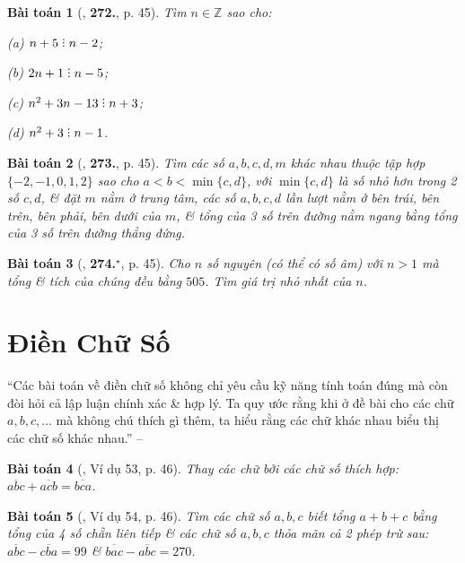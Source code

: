 \documentclass{article}
\numberwithin{equation}{section}
\newtheorem{baitoan}{Bài toán}
\DeclareRobustCommand{\divby}{%
	\mathrel{\vbox{\baselineskip.65ex\lineskiplimit0pt\hbox{.}\hbox{.}\hbox{.}}}%
}
\begin{document}
\begin{baitoan}[\cite{Binh_Toan_6_tap_1}, \textbf{272.}, p. 45]
	Tìm $n\in\mathbb{Z}$ sao cho:
	\begin{enumerate*}
		\item[(a)] $n + 5\divby n - 2$;
		\item[(b)] $2n + 1\divby n - 5$;
		\item[(c)] $n^2 + 3n - 13\divby n + 3$;
		\item[(d)] $n^2 + 3\divby n - 1$.
	\end{enumerate*}
\end{baitoan}

\begin{baitoan}[\cite{Binh_Toan_6_tap_1}, \textbf{273.}, p. 45]
	Tìm các số $a,b,c,d,m$ khác nhau thuộc tập hợp $\{-2,-1,0,1,2\}$ sao cho $a < b < \min\{c,d\}$, với $\min\{c,d\}$ là số nhỏ hơn trong 2 số $c,d$, \& đặt $m$ nằm ở trung tâm, các số $a,b,c,d$ lần lượt nằm ở bên trái, bên trên, bên phải, bên dưới của $m$, \& tổng của 3 số trên đường nằm ngang bằng tổng của 3 số trên đường thẳng đứng.
\end{baitoan}

\begin{baitoan}[\cite{Binh_Toan_6_tap_1}, \textbf{274.}${}^\star$, p. 45]
	Cho $n$ số nguyên (có thể có số âm) với $n > 1$ mà tổng \& tích của chúng đều bằng $505$. Tìm giá trị nhỏ nhất của $n$.
\end{baitoan}


\section{Điền Chữ Số}
``Các bài toán về điền chữ số không chỉ yêu cầu kỹ năng tính toán đúng mà còn đòi hỏi cả lập luận chính xác \& hợp lý. Ta quy ước rằng khi ở đề bài cho các chữ $a,b,c,\ldots$ mà không chú thích gì thêm, ta hiểu rằng các chữ khác nhau biểu thị các chữ số khác nhau.'' -- \cite[p. 46]{Binh_Toan_6_tap_1}

\begin{baitoan}[\cite{Binh_Toan_6_tap_1}, Ví dụ 53, p. 46]
	Thay các chữ bởi các chữ số thích hợp: $\overline{abc} + \overline{acb} = \overline{bca}$.
\end{baitoan}

\begin{baitoan}[\cite{Binh_Toan_6_tap_1}, Ví dụ 54, p. 46]
	Tìm các chữ số $a,b,c$ biết tổng $a + b + c$ bằng tổng của 4 số chẵn liên tiếp \& các chữ số $a,b,c$ thỏa mãn cả 2 phép trừ sau: $\overline{abc} - \overline{cba} = 99$ \& $\overline{bac} - \overline{abc} = 270$.
\end{baitoan}
\end{document}
